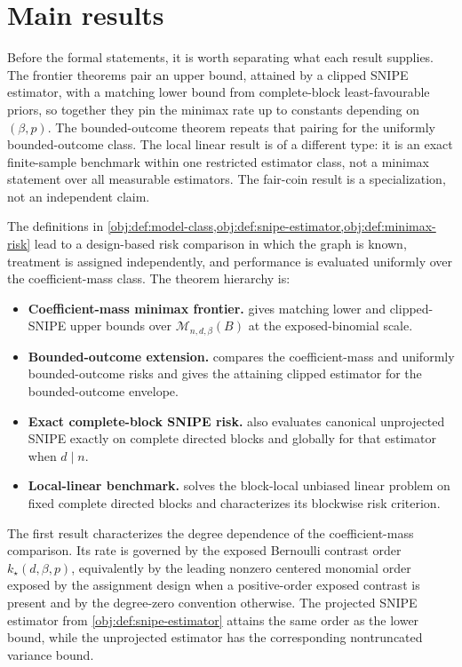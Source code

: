\section{Main results}

Before the formal statements, it is worth separating what each result supplies. The frontier
theorems pair an upper bound, attained by a clipped SNIPE estimator, with a matching lower
bound from complete-block least-favourable priors, so together they pin the minimax rate up to
constants depending on \((\beta,p)\). The bounded-outcome theorem repeats that pairing for the
uniformly bounded-outcome class. The local linear result is of a different type: it is an exact
finite-sample benchmark within one restricted estimator class, not a minimax statement over all
measurable estimators. The fair-coin result is a specialization, not an independent claim.

The definitions in \cref{obj:def:model-class,obj:def:snipe-estimator,obj:def:minimax-risk} lead to a design-based risk comparison in which the graph is known, treatment is assigned independently, and performance is evaluated uniformly over the coefficient-mass class. The theorem hierarchy is:
\begin{itemize}
\item \textbf{Coefficient-mass minimax frontier.}  gives matching lower and clipped-SNIPE upper bounds over \(\mathcal M_{n,d,\beta}(B)\) at the exposed-binomial scale.
\item \textbf{Bounded-outcome extension.}  compares the coefficient-mass and uniformly bounded-outcome risks and gives the attaining clipped estimator for the bounded-outcome envelope.
\item \textbf{Exact complete-block SNIPE risk.}  also evaluates canonical unprojected SNIPE exactly on complete directed blocks and globally for that estimator when \(d\mid n\).
\item \textbf{Local-linear benchmark.}  solves the block-local unbiased linear problem on fixed complete directed blocks and characterizes its blockwise risk criterion.
\end{itemize}
The first result characterizes the degree dependence of the coefficient-mass comparison. Its rate is governed by the exposed Bernoulli contrast order \(k_\star(d,\beta,p)\), equivalently by the leading nonzero centered monomial order exposed by the assignment design when a positive-order exposed contrast is present and by the degree-zero convention otherwise. The projected SNIPE estimator from \cref{obj:def:snipe-estimator} attains the same order as the lower bound, while the unprojected estimator has the corresponding nontruncated variance bound.


